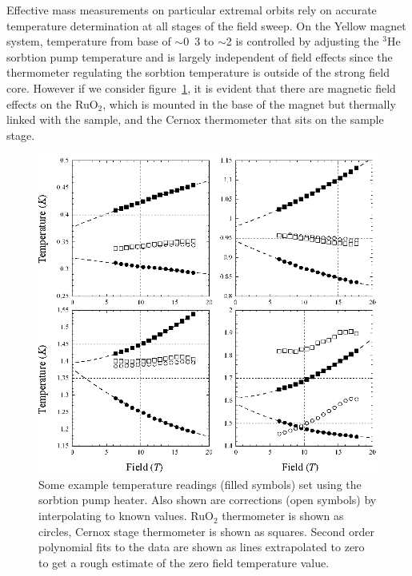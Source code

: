 Effective mass measurements on particular extremal orbits rely on accurate temperature determination at all stages of the field sweep. On the Yellow magnet system, temperature from base of $\sim$\unit{0.3}{\kelvin} to $\sim$\unit{2}{\kelvin} is controlled by adjusting the $^3$He sorbtion pump temperature and is largely independent of field effects since the thermometer regulating the sorbtion temperature is outside of the strong field core. However if we consider figure~\ref{Fig:Exp:TemperatureCorrection}, it is evident that there are magnetic field effects on the RuO$_2$, which is mounted in the base of the magnet but thermally linked with the sample, and the Cernox thermometer that sits on the sample stage.
\begin{figure}[htbp]
    \begin{center}
        \includegraphics[scale=0.9]{Chapter-ExperimentalTechnique/Figures/TemperatureCorrection/TemperatureCorrection}
        \caption{Some example temperature readings (filled symbols) set using the sorbtion pump heater. Also shown are corrections (open symbols) by interpolating to known values. RuO$_2$ thermometer is shown as circles, Cernox stage thermometer is shown as squares. Second order polynomial fits to the data are shown as lines extrapolated to zero to get a rough estimate of the zero field temperature value.}
        \label{Fig:Exp:TemperatureCorrection}
    \end{center}
\end{figure}
